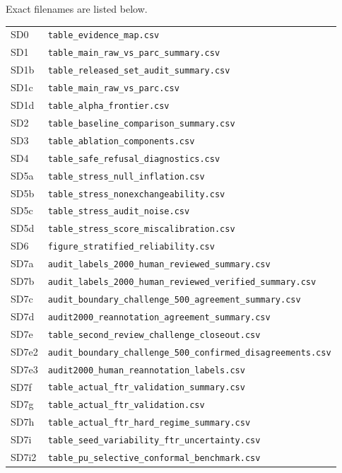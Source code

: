 \documentclass[11pt]{article}
\begin{document}
Exact filenames are listed below.
\begingroup
\scriptsize
\begin{longtable}{ll}
SD0 & \texttt{table\_evidence\_map.csv} \\
SD1 & \texttt{table\_main\_raw\_vs\_parc\_summary.csv} \\
SD1b & \texttt{table\_released\_set\_audit\_summary.csv} \\
SD1c & \texttt{table\_main\_raw\_vs\_parc.csv} \\
SD1d & \texttt{table\_alpha\_frontier.csv} \\
SD2 & \texttt{table\_baseline\_comparison\_summary.csv} \\
SD3 & \texttt{table\_ablation\_components.csv} \\
SD4 & \texttt{table\_safe\_refusal\_diagnostics.csv} \\
SD5a & \texttt{table\_stress\_null\_inflation.csv} \\
SD5b & \texttt{table\_stress\_nonexchangeability.csv} \\
SD5c & \texttt{table\_stress\_audit\_noise.csv} \\
SD5d & \texttt{table\_stress\_score\_miscalibration.csv} \\
SD6 & \texttt{figure\_stratified\_reliability.csv} \\
SD7a & \texttt{audit\_labels\_2000\_human\_reviewed\_summary.csv} \\
SD7b & \texttt{audit\_labels\_2000\_human\_reviewed\_verified\_summary.csv} \\
SD7c & \texttt{audit\_boundary\_challenge\_500\_agreement\_summary.csv} \\
SD7d & \texttt{audit2000\_reannotation\_agreement\_summary.csv} \\
SD7e & \texttt{table\_second\_review\_challenge\_closeout.csv} \\
SD7e2 & \texttt{audit\_boundary\_challenge\_500\_confirmed\_disagreements.csv} \\
SD7e3 & \texttt{audit2000\_human\_reannotation\_labels.csv} \\
SD7f & \texttt{table\_actual\_ftr\_validation\_summary.csv} \\
SD7g & \texttt{table\_actual\_ftr\_validation.csv} \\
SD7h & \texttt{table\_actual\_ftr\_hard\_regime\_summary.csv} \\
SD7i & \texttt{table\_seed\_variability\_ftr\_uncertainty.csv} \\
SD7i2 & \texttt{table\_pu\_selective\_conformal\_benchmark.csv} \\

\end{longtable}
\end{document}
